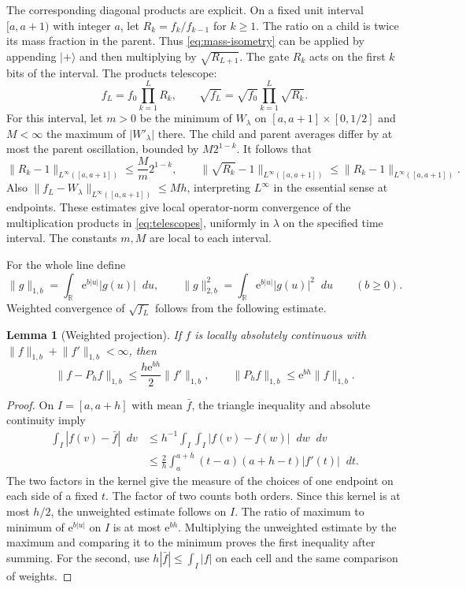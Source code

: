\documentclass[11pt]{article}
\newtheorem{lemma}[theorem]{Lemma}
\newcommand{\R}{\mathbb R}
\newcommand{\dd}{\mathop{}\!d}
\newcommand{\ee}{\mathrm e}
\newcommand{\abs}[1]{\lvert#1\rvert}
\newcommand{\norm}[1]{\lVert#1\rVert}
\begin{document}
The corresponding diagonal products are explicit. On a fixed
unit interval \([a,a+1)\) with integer \(a\), let
\(R_k=f_k/f_{k-1}\) for \(k\ge1\). The ratio on a child is twice
its mass fraction in the parent. Thus \eqref{eq:mass-isometry}
can be applied by appending \(\lvert+\rangle\) and then
multiplying by \(\sqrt{R_{L+1}}\). The gate \(R_k\) acts on the
first \(k\) bits of the interval. The products telescope:
\begin{equation}\label{eq:telescopes}
  f_L=f_0\prod_{k=1}^L R_k,\qquad
  \sqrt{f_L}=\sqrt{f_0}\prod_{k=1}^L\sqrt{R_k}.
\end{equation}
For this interval, let \(m>0\) be the minimum of \(W_\lambda\) on
\([a,a+1]\times[0,1/2]\) and \(M<\infty\) the maximum of
\(\abs{W'_\lambda}\) there. The child and parent averages differ
by at most the parent oscillation, bounded by \(M2^{1-k}\).
It follows that
\[
 \norm{R_k-1}_{L^\infty([a,a+1])}\le \frac{M}{m}2^{1-k},
 \qquad
 \norm{\sqrt{R_k}-1}_{L^\infty([a,a+1])}
       \le \norm{R_k-1}_{L^\infty([a,a+1])}.
\]
Also \(\norm{f_L-W_\lambda}_{L^\infty([a,a+1])}\le M h\),
interpreting \(L^\infty\) in the essential sense at endpoints.
These estimates give local operator-norm convergence of the
multiplication products in \eqref{eq:telescopes}, uniformly in
\(\lambda\) on the specified time interval. The constants \(m,M\)
are local to each interval.

For the whole line define
\[
 \norm{g}_{1,b}=\int_{\R}\ee^{b|u|}|g(u)|\dd u,\qquad
 \norm{g}_{2,b}^2=\int_{\R}\ee^{b|u|}|g(u)|^2\dd u\qquad (b\ge0).
\]
Weighted convergence of \(\sqrt{f_L}\) follows from the following
estimate.

\begin{lemma}[Weighted projection]\label{lem:projection}
If \(f\) is locally absolutely continuous with
\(\norm{f}_{1,b}+\norm{f'}_{1,b}<\infty\), then
\begin{equation}\label{eq:projection}
 \norm{f-P_h f}_{1,b}\le \frac{h\ee^{bh}}2\norm{f'}_{1,b},
 \qquad
 \norm{P_h f}_{1,b}\le \ee^{bh}\norm{f}_{1,b}.
\end{equation}
\end{lemma}

\begin{proof}
On \(I=[a,a+h]\) with mean \(\bar f\), the triangle inequality
and absolute continuity imply
\[
 \begin{split}
 \int_I|f(v)-\bar f|\dd v
 &\le h^{-1}\int_I\int_I |f(v)-f(w)|\dd w\dd v\\
 &\le \frac{2}{h}\int_a^{a+h}(t-a)(a+h-t)|f'(t)|\dd t .
 \end{split}
\]
The two factors in the kernel give the measure of the choices
of one endpoint on each side of a fixed \(t\). The factor of two
counts both orders. Since this kernel is at most \(h/2\), the
unweighted estimate follows on \(I\). The ratio of maximum to
minimum of \(\ee^{b|u|}\) on \(I\) is at most \(\ee^{bh}\).
Multiplying the unweighted estimate by the maximum and comparing
it to the minimum proves the first inequality after summing.
For the second, use \(h|\bar f|\le\int_I|f|\) on each cell and
the same comparison of weights.
\end{proof}
\end{document}
